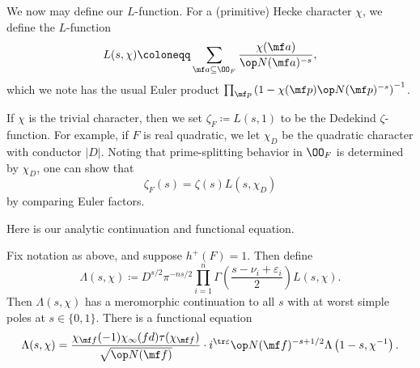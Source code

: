 \documentclass{article}
\begin{document}
We now may define our $L$-function. For a (primitive) Hecke character $\chi$, we define the $L$-function
\[L(s,\chi)\coloneqq\sum_{\mf a\subseteq\OO_F}\frac{\chi(\mf a)}{\op N(\mf a)^{-s}},\]
which we note has the usual Euler product $\prod_{\mf p}\left(1-\chi(\mf p)\op N(\mf p)^{-s}\right)^{-1}$.
\begin{example}
	If $\chi$ is the trivial character, then we set $\zeta_F\coloneqq L(s,1)$ to be the Dedekind $\zeta$-function. For example, if $F$ is real quadratic, we let $\chi_D$ be the quadratic character with conductor $\left|D\right|$. Noting that prime-splitting behavior in $\OO_F$ is determined by $\chi_D$, one can show that
	\[\zeta_F(s)=\zeta(s)L(s,\chi_D)\]
	by comparing Euler factors.
\end{example}
Here is our analytic continuation and functional equation.
\begin{theorem}
	Fix notation as above, and suppose $h^+(F)=1$. Then define
	\[\Lambda(s,\chi)\coloneqq D^{s/2}\pi^{-ns/2}\prod_{i=1}^n\Gamma\left(\frac{s-\nu_i+\varepsilon_i}2\right)L(s,\chi).\]
	Then $\Lambda(s,\chi)$ has a meromorphic continuation to all $s$ with at worst simple poles at $s\in\{0,1\}$. There is a functional equation
	\[\Lambda(s,\chi)=\frac{\chi_{\mf f}(-1)\chi_\infty(fd)\tau(\chi_{\mf f})}{\sqrt{\op N(\mf f)}}\cdot i^{\tr\varepsilon}\op N(\mf f)^{-s+1/2}\Lambda\left(1-s,\chi^{-1}\right).\]
\end{theorem}
\end{document}
